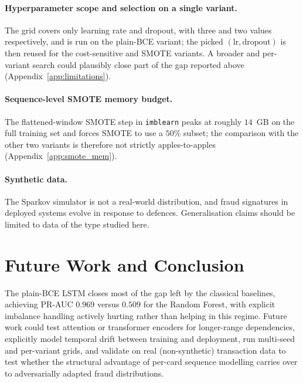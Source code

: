 \documentclass[oneside,12pt,parskip=half,american,numbers=noenddot]{scrreprt}
\begin{document}
\paragraph{Hyperparameter scope and selection on a single variant.} The grid covers only learning rate and dropout, with three and two values respectively, and is run on the plain-BCE variant; the picked $(\text{lr}, \text{dropout})$ is then reused for the cost-sensitive and SMOTE variants. A broader and per-variant search could plausibly close part of the gap reported above (Appendix~\ref{app:limitations}).

\paragraph{Sequence-level SMOTE memory budget.} The flattened-window SMOTE step in \texttt{imblearn} peaks at roughly $14$~GB on the full training set and forces SMOTE to use a $50\%$ subset; the comparison with the other two variants is therefore not strictly apples-to-apples (Appendix~\ref{app:smote_mem}).

\paragraph{Synthetic data.} The Sparkov simulator is not a real-world distribution, and fraud signatures in deployed systems evolve in response to defences. Generalisation claims should be limited to data of the type studied here.

\section{Future Work and Conclusion}
\label{sec:conclusion}

The plain-BCE LSTM closes most of the gap left by the classical baselines, achieving PR-AUC $0.969$ versus $0.509$ for the Random Forest, with explicit imbalance handling actively hurting rather than helping in this regime. Future work could test attention or transformer encoders for longer-range dependencies, explicitly model temporal drift between training and deployment, run multi-seed and per-variant grids, and validate on real (non-synthetic) transaction data to test whether the structural advantage of per-card sequence modelling carries over to adversarially adapted fraud distributions.


\cleardoublepage
{}
\setcounter{page}{1}
\end{document}
